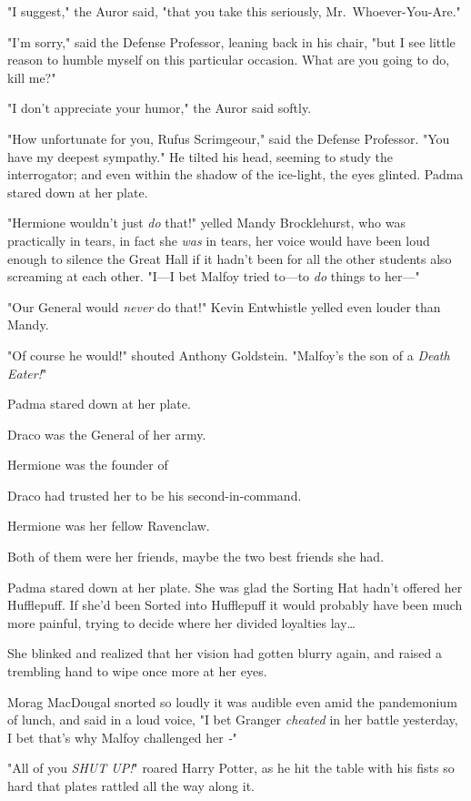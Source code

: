 "I suggest," the Auror said, "that you take this seriously, 
Mr.~Whoever-You-Are."

"I'm sorry," said the Defense Professor, leaning back in his chair, "but I see 
little reason to humble myself on this particular occasion. What are you going 
to do, kill me?"

"I don't appreciate your humor," the Auror said softly.

"How unfortunate for you, Rufus Scrimgeour," said the Defense Professor. "You 
have my deepest sympathy." He tilted his head, seeming to study the 
interrogator; and even within the shadow of the ice-light, the eyes glinted.
\sbreak
Padma stared down at her plate.

"Hermione wouldn't just \emph{do} that!" yelled Mandy Brocklehurst, who was 
practically in tears, in fact she \emph{was} in tears, her voice would have 
been loud enough to silence the Great Hall if it hadn't been for all the other 
students also screaming at each other. "I---I bet Malfoy tried to---to 
\emph{do} things to her---"

"Our General would \emph{never} do that!" Kevin Entwhistle yelled even louder 
than Mandy.

"Of course he would!" shouted Anthony Goldstein. "Malfoy's the son of a 
\emph{Death Eater!}"

Padma stared down at her plate.

Draco was the General of her army.

Hermione was the founder of \SPHEW

Draco had trusted her to be his second-in-command.

Hermione was her fellow Ravenclaw.

Both of them were her friends, maybe the two best friends she had.

Padma stared down at her plate. She was glad the Sorting Hat hadn't offered her 
Hufflepuff. If she'd been Sorted into Hufflepuff it would probably have been 
much more painful, trying to decide where her divided loyalties lay{\ldots}

She blinked and realized that her vision had gotten blurry again, and raised a 
trembling hand to wipe once more at her eyes.

Morag MacDougal snorted so loudly it was audible even amid the pandemonium of 
lunch, and said in a loud voice, "I bet Granger \emph{cheated} in her battle 
yesterday, I bet that's why Malfoy challenged her \emph{-}"

"All of you \emph{SHUT UP!}" roared Harry Potter, as he hit the table with his 
fists so hard that plates rattled all the way along it.

